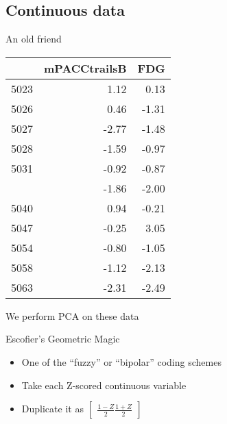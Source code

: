 \documentclass[
  ignorenonframetext,
]{beamer}
\providecommand{\tightlist}{%
  \setlength{\itemsep}{0pt}\setlength{\parskip}{0pt}}
\begin{document}
\hypertarget{continuous-data}{%
\subsection{Continuous data}\label{continuous-data}}

\begin{frame}{An old friend}
\protect\hypertarget{an-old-friend}{}

\begin{table}[H]
\centering\begingroup\fontsize{7}{9}\selectfont

\begin{tabular}{lrr}
\toprule
  & mPACCtrailsB & FDG\\
\midrule
5023 & 1.12 & 0.13\\
5026 & 0.46 & -1.31\\
5027 & -2.77 & -1.48\\
5028 & -1.59 & -0.97\\
5031 & -0.92 & -0.87\\
\addlinespace
5037 & -1.86 & -2.00\\
5040 & 0.94 & -0.21\\
5047 & -0.25 & 3.05\\
5054 & -0.80 & -1.05\\
5058 & -1.12 & -2.13\\
5063 & -2.31 & -2.49\\
\bottomrule
\end{tabular}\endgroup{}
\end{table}
\begin{center}We perform PCA on these data\end{center}

\end{frame}

\begin{frame}{Escofier's Geometric Magic}
\protect\hypertarget{escofiers-geometric-magic}{}

\begin{itemize}[<+->]
\tightlist
\item
  One of the ``fuzzy'' or ``bipolar'' coding schemes
\item
  Take each Z-scored continuous variable
\item
  Duplicate it as
  \(\begin{bmatrix} \frac{1-Z}{2} \frac{1+Z}{2}\end{bmatrix}\)
\end{itemize}

\end{frame}
\end{document}

